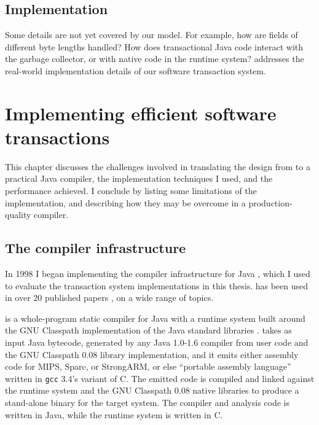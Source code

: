 \section*{Implementation}
Some details are not yet covered by our model.
For example, how are fields of different byte lengths handled?  How does
transactional Java code interact with the garbage collector, or with
native code in the runtime system?   addresses the
real-world
implementation details of our software transaction system.

\chapter{Implementing efficient software transactions}\label{cha:stmimpl}

This chapter discusses the challenges involved in translating the
design from  to a practical Java
compiler, the implementation techniques I used, and the performance
achieved.  I conclude by listing some limitations of the
implementation, and describing how they may be overcome in a
production-quality compiler.

\section{The \flex compiler infrastructure}
In 1998 I began implementing the \flex compiler infrastructure for
Java \cite{Flex}, which I used to evaluate the transaction system
implementations in this thesis.  \Flex has been used in over 20
published papers
\cite{DallmeierLiWaZe06,AnanianAsKuLeLi06,Ananian05,AnanianAsKuLeLi05,SalcianuRi05,RinardSaBu04,AnanianRi03,BoyapatiSaBeRi03,FeizabadiBeRaLiRi03,GheorghioiuSaRi03,ZeeRi02,WitchelCaAs02,Gheorghioiu02,Francu02,WitchelLaAnAs01,Whaley01,Salcianu01,BeebeeRi01,Beebee01,Klock01,SalcianuRi01,VivienRi01,Ananian99,WhaleyRi99},
on a wide range of topics.

\Flex is a whole-program static compiler for Java with a runtime
system built around the GNU Classpath implementation of the Java
standard libraries \cite{Classpath}.  \Flex takes as input Java
bytecode, generated by any Java 1.0-1.6 compiler from user code and
the GNU Classpath 0.08 library implementation, and it emits either
assembly code for MIPS, Sparc, or StrongARM, or else 
``portable assembly language'' written in \texttt{gcc} 3.4's variant
of C\@.  The emitted code is compiled and linked against the \flex runtime
system and the GNU Classpath 0.08 native libraries to produce a
stand-alone binary for the target system.  The \flex compiler and
analysis code is written in Java, while the \flex runtime system is
written in C\@.

